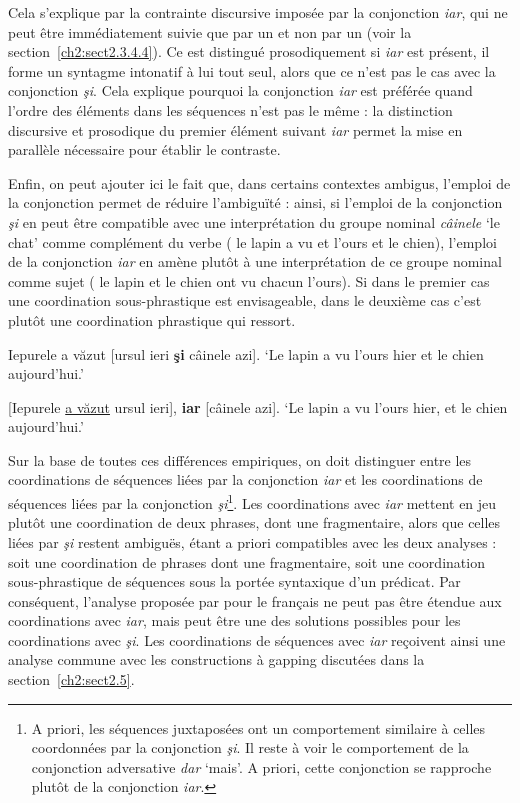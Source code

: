 Cela s’explique par la contrainte discursive imposée par la conjonction \textit{iar}, qui ne peut être immédiatement suivie que par un  et non par un  (voir la section~\ref{ch2:sect2.3.4.4}). Ce  est distingué prosodiquement si \textit{iar} est présent, {\cad} il forme un syntagme intonatif à lui tout seul, alors que ce n’est pas le cas avec la conjonction \textit{şi}. Cela explique pourquoi la conjonction \textit{iar} est préférée quand l’ordre des éléments dans les séquences n’est pas le même  : la distinction discursive et prosodique du premier élément suivant \textit{iar} permet la mise en parallèle nécessaire pour établir le contraste.

Enfin, on peut ajouter ici le fait que, dans certains contextes ambigus, l’emploi de la conjonction permet de réduire l’ambiguïté : ainsi, si l’emploi de la conjonction \textit{şi} en  peut être compatible avec une interprétation du groupe nominal \textit{câinele} ‘le chat’ comme complément du verbe ({\cad} le lapin a vu et l’ours et le chien), l’emploi de la conjonction \textit{iar} en  amène plutôt à une interprétation de ce groupe nominal comme sujet ({\cad} le lapin et le chien ont vu chacun l’ours). Si dans le premier cas une coordination sous-phrastique est envisageable, dans le deuxième cas c’est plutôt une coordination phrastique qui ressort.

\ea \label{ch2:ex316}
\ea Iepurele a văzut [ursul ieri \textbf{şi} câinele azi]. \label{ch2:ex316a} 
\glt ‘Le lapin a vu l’ours hier et le chien aujourd’hui.’

\ex {} [Iepurele \uline{a văzut} ursul ieri], \textbf{iar} [câinele azi]. \label{ch2:ex316b} 
\glt ‘Le lapin a vu l’ours hier, et le chien aujourd’hui.’
\z
\z

Sur la base de toutes ces différences empiriques, on doit distinguer entre les coordinations de séquences liées par la conjonction \textit{iar} et les coordinations de séquences liées par la conjonction \textit{şi}\footnote{
 A priori, les séquences juxtaposées ont un comportement similaire à celles coordonnées par la conjonction \textit{şi}. Il reste à voir le comportement de la conjonction adversative \textit{dar} ‘mais’. A priori, cette conjonction se rapproche plutôt de la conjonction \textit{iar}.}. Les coordinations avec \textit{iar} mettent en jeu plutôt une coordination de deux phrases, dont une fragmentaire, alors que celles liées par \textit{şi} restent ambiguës, étant a priori compatibles avec les deux analyses : soit une coordination de phrases dont une fragmentaire, soit une coordination sous-phrastique de séquences sous la portée syntaxique d’un prédicat. Par conséquent, l’analyse proposée par \citet{Mouret2006,Mouret2007,Mouret2008} pour le français ne peut pas être étendue aux coordinations avec \textit{iar}, mais peut être une des solutions possibles pour les coordinations avec \textit{şi}. Les coordinations de séquences avec \textit{iar} reçoivent ainsi une analyse commune avec les constructions à gapping discutées dans la section~\ref{ch2:sect2.5}. 

